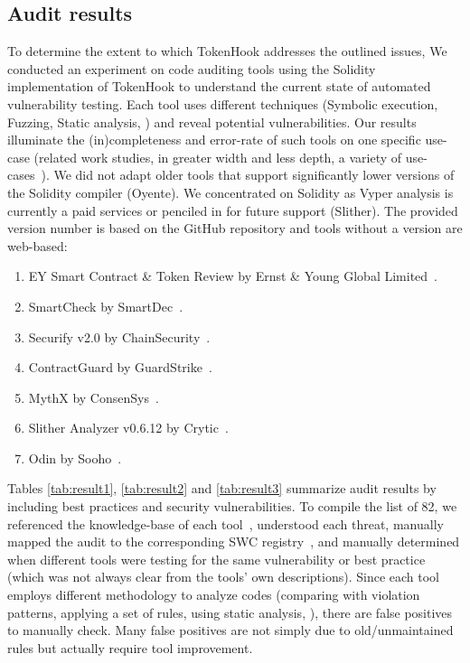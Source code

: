 \subsection{Audit results}
To determine the extent to which TokenHook addresses the outlined issues, We conducted an experiment on code auditing tools using the Solidity implementation of TokenHook to understand the current state of automated vulnerability testing. Each tool uses different techniques (\eg Symbolic execution, Fuzzing, Static analysis, \etc) and reveal potential vulnerabilities. Our results illuminate the (in)completeness and error-rate of such tools on one specific use-case (related work studies, in greater width and less depth, a variety of use-cases~\cite{AuditTools}). We did not adapt older tools that support significantly lower versions of the Solidity compiler (\eg Oyente). We concentrated on Solidity as Vyper analysis is currently a paid services or penciled in for future support (\eg Slither). The provided version number is based on the GitHub repository and tools without a version are web-based:
\begin{enumerate}
	\item EY Smart Contract \& Token Review by Ernst \& Young Global Limited~\cite{EYTool}.
	\item SmartCheck by SmartDec~\cite{SMARTCHECK}.
	\item Securify v2.0 by ChainSecurity~\cite{SECURIFYGIT,SECURIFY}.
	\item ContractGuard by GuardStrike~\cite{ContractGuard}.
	\item MythX by ConsenSys~\cite{MythX}.
	\item Slither Analyzer v0.6.12 by Crytic~\cite{SlitherDoc}.
	\item Odin by Sooho~\cite{Odin}.
\end{enumerate}
Tables \ref{tab:result1}, \ref{tab:result2} and \ref{tab:result3} summarize audit results by including best practices and security vulnerabilities. To compile the list of 82, we referenced the knowledge-base of each tool~\cite{SECURIFYGIT,SMARTCHECK,MythX,ContractGuard,SlitherDoc}, understood each threat, manually mapped the audit to the corresponding SWC registry~\cite{SWC}, and manually determined when different tools were testing for the same vulnerability or best practice (which was not always clear from the tools' own descriptions). Since each tool employs different methodology to analyze codes (\eg comparing with violation patterns, applying a set of rules, using static analysis, \etc), there are false positives to manually check. Many false positives are not simply due to old/unmaintained rules but actually require tool improvement.

